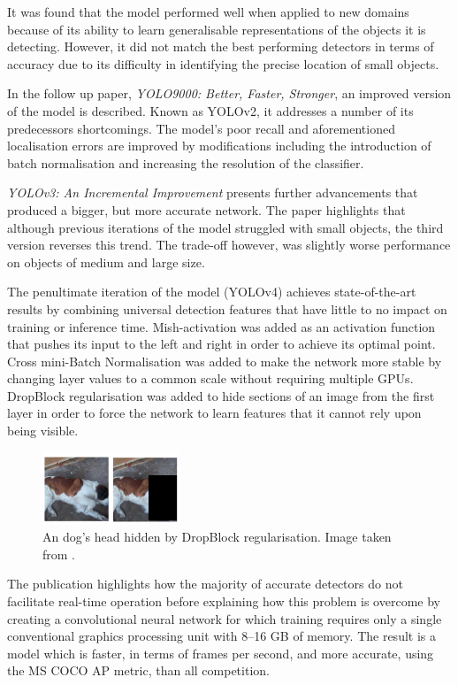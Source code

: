 \documentclass{thesis}
\begin{document}
It was found that the model performed well when applied to new domains because of its ability to learn generalisable representations of the objects it is detecting. However, it did not match the best performing detectors in terms of accuracy due to its difficulty in identifying the precise location of small objects.

In the follow up paper, \textit{YOLO9000: Better, Faster, Stronger}, an improved version of the model is described. Known as YOLOv2, it addresses a number of its predecessors shortcomings. The model's poor recall and aforementioned localisation errors are improved by modifications including the introduction of batch normalisation and increasing the resolution of the classifier\cite{yolo2}.

\textit{YOLOv3: An Incremental Improvement} presents further advancements that produced a bigger, but more accurate network. The paper highlights that although previous iterations of the model struggled with small objects, the third version reverses this trend. The trade-off however, was slightly worse performance on objects of medium and large size\cite{yolo3}.

The penultimate iteration of the model (YOLOv4) achieves state-of-the-art results by combining universal detection features that have little to no impact on training or inference time\cite{yolov4}. Mish-activation was added as an activation function that pushes its input to the left and right in order to achieve its optimal point. Cross mini-Batch Normalisation was added to make the network more stable by changing layer values to a common scale without requiring multiple GPUs. DropBlock regularisation was added to hide sections of an image from the first layer in order to force the network to learn features that it cannot rely upon being visible.

\begin{figure}[h]
    \centering
    \includegraphics[scale=1]{images/dropblock.png}
    \caption{An dog's head hidden by DropBlock regularisation. Image taken from \cite{cutmix}.}
    \label{fig:dropblock}
\end{figure}


The publication highlights how the majority of accurate detectors do not facilitate real-time operation before explaining how this problem is overcome by creating a convolutional neural network for which training requires only a single conventional graphics processing unit with 8--16 GB of memory. The result is a model which is faster, in terms of frames per second, and more accurate, using the MS COCO AP metric, than all competition.
\end{document}
